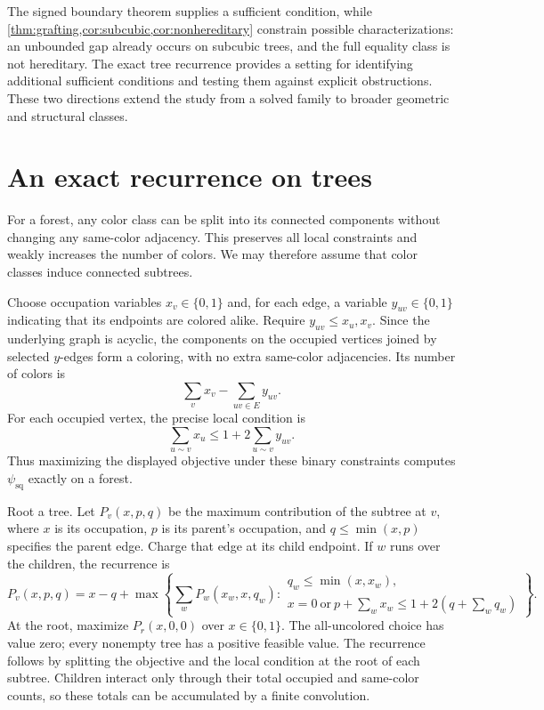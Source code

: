 \documentclass[11pt]{article}
\theoremstyle{definition}
\theoremstyle{remark}
\newcommand{\psq}{\psi_{\mathrm{sq}}}
\begin{document}
The signed boundary theorem supplies a sufficient condition, while
\cref{thm:grafting,cor:subcubic,cor:nonhereditary} constrain possible
characterizations: an unbounded gap already occurs on subcubic trees,
and the full equality class is not hereditary. The exact tree recurrence
provides a setting for identifying additional sufficient conditions and
testing them against explicit obstructions. These two directions extend
the study from a solved family to broader geometric and structural classes.

\appendix
\section{An exact recurrence on trees}\label{app:tree}

For a forest, any color class can be split into its connected components
without changing any same-color adjacency. This preserves all local
constraints and weakly increases the number of colors. We may therefore
assume that color classes induce connected subtrees.

Choose occupation variables $x_v\in\{0,1\}$ and, for each edge, a variable
$y_{uv}\in\{0,1\}$ indicating that its endpoints are colored alike.
Require $y_{uv}\le x_u,x_v$. Since the underlying graph is acyclic, the
components on the occupied vertices joined by selected $y$-edges form a
coloring, with no extra
same-color adjacencies. Its number of colors is
\[
 \sum_v x_v-\sum_{uv\in E}y_{uv}.
\]
For each occupied vertex, the precise local condition is
\begin{equation}\label{eq:tree-local}
 \sum_{u\sim v}x_u\le1+2\sum_{u\sim v}y_{uv}.
\end{equation}
Thus maximizing the displayed objective under these binary constraints
computes $\psq$ exactly on a forest.

Root a tree. Let $P_v(x,p,q)$ be the maximum contribution of the subtree
at $v$, where $x$ is its occupation, $p$ is its parent's occupation, and
$q\le\min(x,p)$ specifies the parent edge. Charge that edge at its child
endpoint. If $w$ runs over the children, the recurrence is
\begin{equation}\label{eq:tree-dp}
 P_v(x,p,q)=x-q+
 \max\left\{\sum_wP_w(x_w,x,q_w):
 \begin{array}{l}
 q_w\le\min(x,x_w),\\
 x=0\ \text{or}\ p+\sum_wx_w\le1+2(q+\sum_wq_w)
 \end{array}\right\}.
\end{equation}
At the root, maximize $P_r(x,0,0)$ over $x\in\{0,1\}$. The all-uncolored
choice has value zero; every nonempty tree has a positive feasible value.
The recurrence follows by splitting the objective and the local condition
at the root of each subtree. Children interact only through their total
occupied and same-color counts, so these totals can be accumulated by a
finite convolution.
\end{document}
